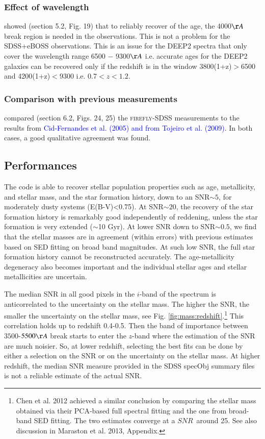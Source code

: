 \documentclass[onecolumn]{aa}
\begin{document}
\subsubsection{Effect of wavelength}
\citet{firefly2017MNRAS} showed (section 5.2, Fig. 19) that to reliably recover of the age, the 4000$\AA$ break region is needed in the observations. This is not a problem for the SDSS+eBOSS observations. This is an issue for the DEEP2 spectra that only cover the wavelength range 6500 − 9300$\AA$ i.e. accurate ages for the DEEP2 galaxies can be recovered only if the redshift is in the window 3800(1+z)$>$6500 and 4200(1+z)$<$9300 i.e. $0.7<z<1.2$.

\subsubsection{Comparison with previous measurements}
\citet{firefly2017MNRAS} compared (section 6.2, Figs. 24, 25) the \textsc{firefly}-SDSS measurements to the results from \textcolor{blue}{Cid-Fernandes et al. (2005) and from Tojeiro et al. (2009)}. In both cases, a good qualitative agreement was found.

\subsection{Performances}
\label{subsec:firefly:performances}
The code is able to recover stellar population properties such as age, metallicity, and stellar mass, and the star formation history, 
down to an SNR$\sim5$, for moderately dusty systems (E(B-V)<0.75). 
At SNR$\sim20$, the recovery of the star formation history is remarkably good independently of reddening, unless the star formation is very extended ($\sim$10 Gyr). 
At lower SNR down to SNR$\sim0.5$, we find that the stellar masses are in agreement (within errors) with previous estimates based on SED fitting on broad band magnitudes. 
At such low SNR, the full star formation history cannot be reconstructed accurately. The age-metallicity degeneracy also becomes important and the individual stellar ages and stellar metallicities are uncertain.

The median SNR in all good pixels in the $i$-band of the spectrum is anticorrelated to the uncertainty on the stellar mass. The higher the SNR, the smaller the uncertainty on the stellar mass, see Fig. \ref{fig:mass:redshift}.\footnote{Chen et al. 2012 achieved a similar conclusion by comparing the stellar mass obtained via their PCA-based full spectral fitting and the one from broad-band SED fitting. The two estimates converge at a $SNR$~around 25. See also discussion in Maraston et al. 2013, Appendix.} 
This correlation holds up to redshift 0.4-0.5. 
Then the band of importance between $3500$-$5500\AA$ break starts to enter the $z$-band where the estimation of the SNR are much noisier. 
So, at lower redshift, selecting the best fits can be done by either a selection on the SNR or on the uncertainty on the stellar mass. 
At higher redshift, the median SNR measure provided in the SDSS specObj summary files is not a reliable estimate of the actual SNR. 
\end{document}
